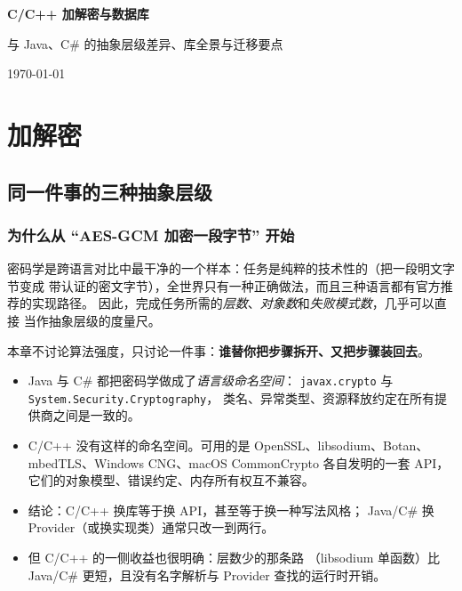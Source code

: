 \documentclass[12pt,a4paper,fontset=fandol]{ctexbook}
\newcommand{\Tp}[1]{\texttt{#1}}
\newcommand{\CSharp}{C\#}
\newcommand{\CppJava}{C/C++}
\begin{document}
\frontmatter

\begin{titlepage}
\centering
\vspace*{4cm}
{\Huge\bfseries C/C++ 加解密与数据库\par}
\vspace{1cm}
{\LARGE 与 Java、C\# 的抽象层级差异、库全景与迁移要点\par}
\vfill
{\large \today\par}
\end{titlepage}

\tableofcontents

\mainmatter

\part{加解密}

\chapter{同一件事的三种抽象层级}

\section{为什么从 ``AES-GCM 加密一段字节'' 开始}

密码学是跨语言对比中最干净的一个样本：任务是纯粹的技术性的（把一段明文字节变成
带认证的密文字节），全世界只有一种正确做法，而且三种语言都有官方推荐的实现路径。
因此，完成任务所需的\emph{层数}、\emph{对象数}和\emph{失败模式数}，几乎可以直接
当作抽象层级的度量尺。

本章不讨论算法强度，只讨论一件事：\textbf{谁替你把步骤拆开、又把步骤装回去}。

\begin{guideline}[title=本章要点]
\begin{itemize}
  \item Java 与 \CSharp{} 都把密码学做成了\emph{语言级命名空间}：
        \Tp{javax.crypto} 与 \Tp{System.\allowbreak Security.\allowbreak Cryptography}，
        类名、异常类型、资源释放约定在所有提供商之间是一致的。
  \item \CppJava{} 没有这样的命名空间。可用的是 OpenSSL、libsodium、Botan、
        mbedTLS、Windows CNG、macOS CommonCrypto 各自发明的一套 API，
        它们的对象模型、错误约定、内存所有权互不兼容。
  \item 结论：\CppJava{} 换库等于换 API，甚至等于换一种写法风格；
        Java/\allowbreak{}\CSharp{} 换 Provider（或换实现类）通常只改一到两行。
  \item 但 \CppJava{} 的一侧收益也很明确：层数少的那条路
        （libsodium 单函数）比 Java/\allowbreak{}\CSharp{} 更短，且没有名字解析与
        Provider 查找的运行时开销。
\end{itemize}
\end{guideline}
\end{document}
